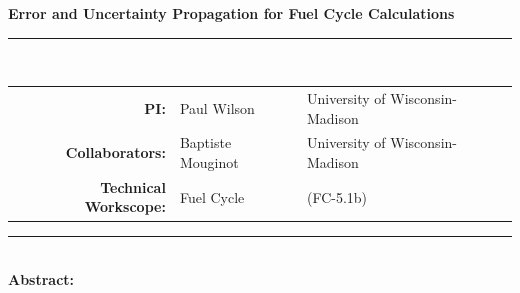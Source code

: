 \documentclass[dvips,12pt]{article}
\begin{document}
\vspace*{0.5in}
\begin{centering}
  \textbf{\large Error and Uncertainty Propagation for Fuel Cycle Calculations}\\
\end{centering}

\noindent\rule{\textwidth}{0.4pt}\\

\noindent
\begin{tabular}{rll}
\textbf{PI:} & Paul Wilson & University of Wisconsin-Madison\\
\textbf{Collaborators:} & Baptiste Mouginot & University of Wisconsin-Madison\\
\textbf{Technical Workscope:} & Fuel Cycle  & (FC-5.1b)\\
\end{tabular}

\vspace{0.2in}
\noindent\rule{\textwidth}{0.4pt}\\

\noindent\textbf{Abstract:} 
\end{document}
